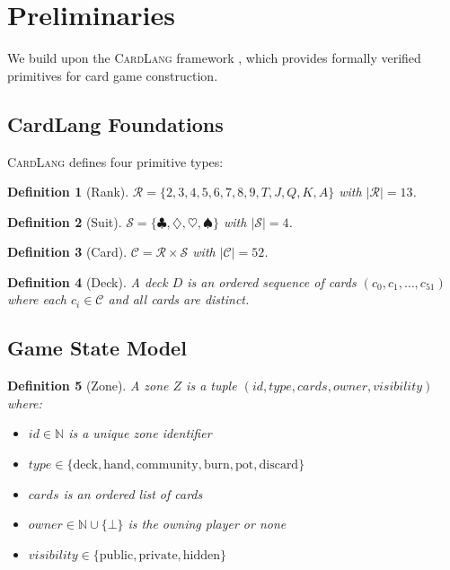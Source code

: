 \documentclass[11pt,a4paper]{article}
\newtheorem{definition}{Definition}[section]
\begin{document}
\section{Preliminaries}
\label{sec:preliminaries}

We build upon the \textsc{CardLang} framework \cite{cardlang2024}, which provides formally verified primitives for card game construction.

\subsection{CardLang Foundations}

\textsc{CardLang} defines four primitive types:

\begin{definition}[Rank]
$\mathcal{R} = \{2, 3, 4, 5, 6, 7, 8, 9, T, J, Q, K, A\}$ with $|\mathcal{R}| = 13$.
\end{definition}

\begin{definition}[Suit]
$\mathcal{S} = \{\clubsuit, \diamondsuit, \heartsuit, \spadesuit\}$ with $|\mathcal{S}| = 4$.
\end{definition}

\begin{definition}[Card]
$\mathcal{C} = \mathcal{R} \times \mathcal{S}$ with $|\mathcal{C}| = 52$.
\end{definition}

\begin{definition}[Deck]
A deck $D$ is an ordered sequence of cards $(c_0, c_1, \ldots, c_{51})$ where each $c_i \in \mathcal{C}$ and all cards are distinct.
\end{definition}

\subsection{Game State Model}

\begin{definition}[Zone]
\label{def:zone}
A zone $Z$ is a tuple $(id, type, cards, owner, visibility)$ where:
\begin{itemize}
    \item $id \in \mathbb{N}$ is a unique zone identifier
    \item $type \in \{\text{deck}, \text{hand}, \text{community}, \text{burn}, \text{pot}, \text{discard}\}$
    \item $cards$ is an ordered list of cards
    \item $owner \in \mathbb{N} \cup \{\bot\}$ is the owning player or none
    \item $visibility \in \{\text{public}, \text{private}, \text{hidden}\}$
\end{itemize}
\end{definition}
\end{document}
